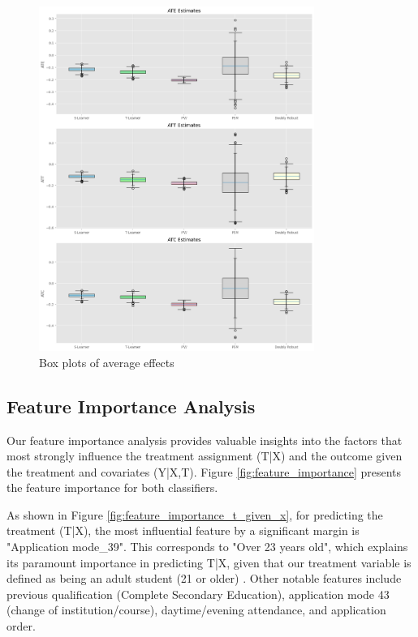 \documentclass{article}
\newcommand{\gur}[1]{{\color{teal}{Gur: #1}}}
\begin{document}
\begin{figure}
    \centering
    \caption{Box plots of average effects}
    \label{fig:box_plots}
    \includegraphics[width = 0.8\textwidth]{plots/box_plots.png}
\end{figure}

\subsection{Feature Importance Analysis}

Our feature importance analysis provides valuable insights into the factors that most strongly influence the treatment assignment (T|X) and the outcome given the treatment and covariates (Y|X,T). Figure \ref{fig:feature_importance} presents the feature importance for both classifiers.

As shown in Figure \ref{fig:feature_importance_t_given_x}, for predicting the treatment (T|X), the most influential feature by a significant margin is "Application mode\_39". This corresponds to "Over 23 years old", which explains its paramount importance in predicting T|X, given that our treatment variable is defined as being an adult student (21 or older) \gur{We will probably remove this feature, it is too strong}. Other notable features include previous qualification (Complete Secondary Education), application mode 43 (change of institution/course), daytime/evening attendance, and application order.
\end{document}
